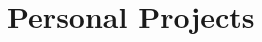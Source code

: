 \documentclass[10pt, letterpaper]{article}
\newenvironment{highlights}{
    \begin{itemize}[
        topsep=0.10cm,
        parsep=0.10cm,
        partopsep=0pt,
        itemsep=0pt,
        leftmargin=0.4cm + 10pt
    ]
}{
    \end{itemize}
}
\newenvironment{onecolentry}{
    \begin{adjustwidth}{0.2cm + 0.00001cm}{0.2cm + 0.00001cm}
}{
    \end{adjustwidth}
}
\newenvironment{twocolentry}[2][]{
    \onecolentry
    \def\secondColumn{#2}
    \setcolumnwidth{\fill, 5.2cm}
    \begin{paracol}{2}
}{
    \switchcolumn \raggedleft \secondColumn
    \end{paracol}
    \endonecolentry
}
\newenvironment{projectentry}{
    \needspace{2.5\baselineskip}
}{
}
\let\hrefWithoutArrow\href
\renewcommand{\href}[2]{\hrefWithoutArrow{#1}{\ifthenelse{\equal{#2}{}}{ }{#2 }\raisebox{.15ex}{\footnotesize \faExternalLink*}}}
\begin{document}


    \section{Personal Projects}
\end{document}
